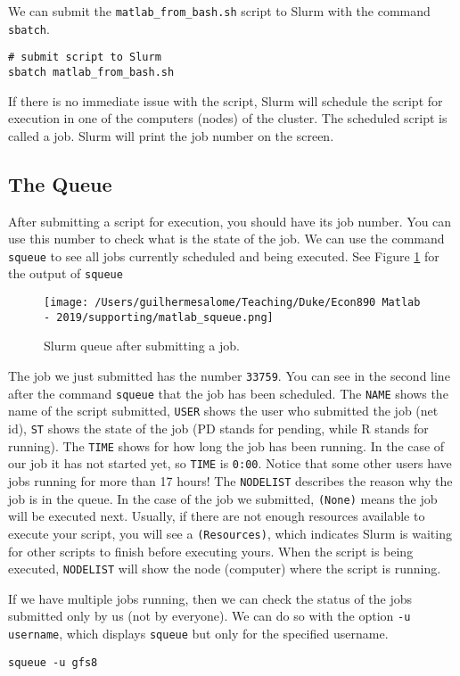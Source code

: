 \documentclass[12pt, a4paper]{article}
\begin{document}
We can submit the \texttt{matlab\_from\_bash.sh} script to Slurm with the command \texttt{sbatch}.
\lstset{language=bash,label= ,caption= ,captionpos=b,firstnumber=1,numbers=left,style=bash}
\begin{lstlisting}
# submit script to Slurm
sbatch matlab_from_bash.sh
\end{lstlisting}
If there is no immediate issue with the script, Slurm will schedule the script for execution in one of the computers (nodes) of the cluster.
The scheduled script is called a job.
Slurm will print the job number on the screen.
\subsection{The Queue}
\label{sec:org700b69f}
After submitting a script for execution, you should have its job number.
You can use this number to check what is the state of the job.
We can use the command \texttt{squeue} to see all jobs currently scheduled and being executed.
See Figure \ref{fig:org0cb56e0} for the output of \texttt{squeue}

\begin{figure}[H]
\centering
\texttt{[image: /Users/guilhermesalome/Teaching/Duke/Econ890 Matlab - 2019/supporting/matlab\_squeue.png]}
\caption{\label{fig:org0cb56e0}
Slurm queue after submitting a job.}
\end{figure}

The job we just submitted has the number \texttt{33759}.
You can see in the second line after the command \texttt{squeue} that the job has been scheduled.
The \texttt{NAME} shows the name of the script submitted, \texttt{USER} shows the user who submitted the job (net id), \texttt{ST} shows the state of the job (PD stands for pending, while R stands for running).
The \texttt{TIME} shows for how long the job has been running.
In the case of our job it has not started yet, so \texttt{TIME} is \texttt{0:00}.
Notice that some other users have jobs running for more than 17 hours!
The \texttt{NODELIST} describes the reason why the job is in the queue.
In the case of the job we submitted, \texttt{(None)} means the job will be executed next.
Usually, if there are not enough resources available to execute your script, you will see a \texttt{(Resources)}, which indicates Slurm is waiting for other scripts to finish before executing yours.
When the script is being executed, \texttt{NODELIST} will show the node (computer) where the script is running.

If we have multiple jobs running, then we can check the status of the jobs submitted only by us (not by everyone).
We can do so with the option \texttt{-u username}, which displays \texttt{squeue} but only for the specified username.
\lstset{language=bash,label= ,caption= ,captionpos=b,firstnumber=1,numbers=left,style=bash}
\begin{lstlisting}
squeue -u gfs8
\end{lstlisting}
\end{document}
